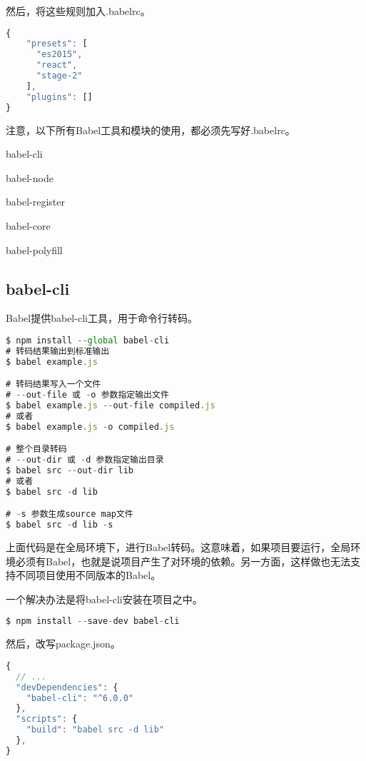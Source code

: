 然后，将这些规则加入.babelrc。



\begin{lstlisting}[language=JavaScript]
{
    "presets": [
      "es2015",
      "react",
      "stage-2"
    ],
    "plugins": []
}
\end{lstlisting}


注意，以下所有Babel工具和模块的使用，都必须先写好.babelrc。

\begin{compactitem}
\item babel-cli
\item babel-node
\item babel-register
\item babel-core
\item babel-polyfill
\end{compactitem}


\subsection{babel-cli}

Babel提供babel-cli工具，用于命令行转码。

\begin{lstlisting}[language=JavaScript]
$ npm install --global babel-cli
# 转码结果输出到标准输出
$ babel example.js

# 转码结果写入一个文件
# --out-file 或 -o 参数指定输出文件
$ babel example.js --out-file compiled.js
# 或者
$ babel example.js -o compiled.js

# 整个目录转码
# --out-dir 或 -d 参数指定输出目录
$ babel src --out-dir lib
# 或者
$ babel src -d lib

# -s 参数生成source map文件
$ babel src -d lib -s
\end{lstlisting}

上面代码是在全局环境下，进行Babel转码。这意味着，如果项目要运行，全局环境必须有Babel，也就是说项目产生了对环境的依赖。另一方面，这样做也无法支持不同项目使用不同版本的Babel。

一个解决办法是将babel-cli安装在项目之中。


\begin{lstlisting}[language=JavaScript]
$ npm install --save-dev babel-cli
\end{lstlisting}


然后，改写package.json。


\begin{lstlisting}[language=JavaScript]
{
  // ...
  "devDependencies": {
    "babel-cli": "^6.0.0"
  },
  "scripts": {
    "build": "babel src -d lib"
  },
}
\end{lstlisting}

